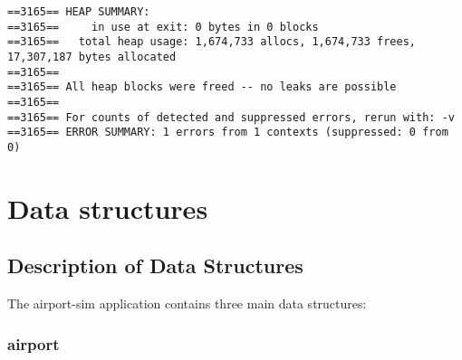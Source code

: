 \documentclass[a4paper, 12pt]{scrartcl} %
\begin{document}
\begin{lstlisting}
==3165== HEAP SUMMARY:
==3165==     in use at exit: 0 bytes in 0 blocks
==3165==   total heap usage: 1,674,733 allocs, 1,674,733 frees, 17,307,187 bytes allocated
==3165== 
==3165== All heap blocks were freed -- no leaks are possible
==3165== 
==3165== For counts of detected and suppressed errors, rerun with: -v
==3165== ERROR SUMMARY: 1 errors from 1 contexts (suppressed: 0 from 0)
\end{lstlisting}

\section{Data structures}

\subsection{Description of Data Structures}

The airport-sim application contains three main data structures:

\subsubsection{airport}
\end{document}
